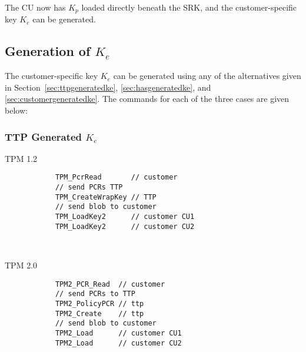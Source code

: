 {The CU now has $K_p$ loaded directly beneath the SRK, and the customer-specific key $K_e$ can be generated.

\subsection{Generation of $K_e$}
The customer-specific key $K_e$ can be generated using any of the alternatives given in Section~\ref{sec:ttpgeneratedke}, \ref{sec:hasgeneratedke}, and \ref{sec:customergeneratedke}.
The commands for each of the three cases are given below:

\subsubsection{TTP Generated $K_e$}
\begin{center}
	\begin{minipage}{0.4\linewidth}
		\begin{center}
			TPM 1.2
		\end{center}
		\begin{tpmcommands}
			\begin{verbatim}
			TPM_PcrRead       // customer
			// send PCRs TTP
			TPM_CreateWrapKey // TTP
			// send blob to customer
			TPM_LoadKey2      // customer CU1
			TPM_LoadKey2      // customer CU2
			\end{verbatim}
		\end{tpmcommands}
	\end{minipage}
	~~~~~~~~
	\begin{minipage}{0.4\linewidth}
		\begin{center}
			TPM 2.0
		\end{center}
		\begin{tpmcommands}
			\begin{verbatim}
			TPM2_PCR_Read  // customer
			// send PCRs to TTP
			TPM2_PolicyPCR // ttp
			TPM2_Create    // ttp
			// send blob to customer
			TPM2_Load      // customer CU1
			TPM2_Load      // customer CU2
			\end{verbatim}
		\end{tpmcommands}
	\end{minipage}
\end{center}


}
